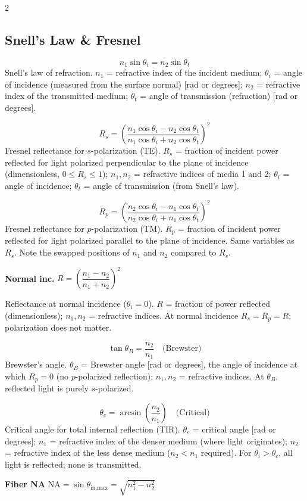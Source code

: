 \documentclass[9pt]{extarticle}
\newcommand{\eqlabel}[1]{\textbf{\scriptsize #1}\;}
\newcommand{\desc}[1]{{\small\color{desc}#1}}
\begin{document}
\begin{multicols}{2}
\subsection{Snell's Law \& Fresnel}
\[n_1\sin\theta_i = n_2\sin\theta_t\]
\desc{Snell's law of refraction. $n_1$ = refractive index of the incident medium; $\theta_i$ = angle of incidence (measured from the surface normal) [rad or degrees]; $n_2$ = refractive index of the transmitted medium; $\theta_t$ = angle of transmission (refraction) [rad or degrees].}

\[R_s = \left(\frac{n_1\cos\theta_i - n_2\cos\theta_t}{n_1\cos\theta_i + n_2\cos\theta_t}\right)^{\!2}\]
\desc{Fresnel reflectance for $s$-polarization (TE). $R_s$ = fraction of incident power reflected for light polarized perpendicular to the plane of incidence (dimensionless, $0 \leq R_s \leq 1$); $n_1, n_2$ = refractive indices of media 1 and 2; $\theta_i$ = angle of incidence; $\theta_t$ = angle of transmission (from Snell's law).}

\[R_p = \left(\frac{n_2\cos\theta_i - n_1\cos\theta_t}{n_2\cos\theta_i + n_1\cos\theta_t}\right)^{\!2}\]
\desc{Fresnel reflectance for $p$-polarization (TM). $R_p$ = fraction of incident power reflected for light polarized parallel to the plane of incidence. Same variables as $R_s$. Note the swapped positions of $n_1$ and $n_2$ compared to $R_s$.}

\eqlabel{Normal inc.} $R = \left(\dfrac{n_1-n_2}{n_1+n_2}\right)^{\!2}$

\desc{Reflectance at normal incidence ($\theta_i = 0$). $R$ = fraction of power reflected (dimensionless); $n_1, n_2$ = refractive indices. At normal incidence $R_s = R_p = R$; polarization does not matter.}

\[\tan\theta_B = \frac{n_2}{n_1} \quad\text{(Brewster)}\]
\desc{Brewster's angle. $\theta_B$ = Brewster angle [rad or degrees], the angle of incidence at which $R_p = 0$ (no $p$-polarized reflection); $n_1, n_2$ = refractive indices. At $\theta_B$, reflected light is purely $s$-polarized.}

\[\theta_c = \arcsin\!\left(\frac{n_2}{n_1}\right) \quad\text{(Critical)}\]
\desc{Critical angle for total internal reflection (TIR). $\theta_c$ = critical angle [rad or degrees]; $n_1$ = refractive index of the denser medium (where light originates); $n_2$ = refractive index of the less dense medium ($n_2 < n_1$ required). For $\theta_i > \theta_c$, all light is reflected; none is transmitted.}

\eqlabel{Fiber NA} $\text{NA} = \sin\theta_{\text{in,max}} = \sqrt{n_1^2 - n_2^2}$


\end{multicols}
\end{document}
